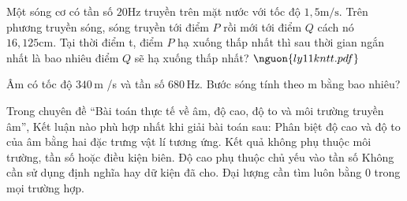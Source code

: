\begin{ex}
Một sóng cơ có tần số $20 \mathrm{Hz}$ truyền trên mặt nước với tốc độ $1,5 \mathrm{m/s}$. Trên phương truyền sóng, sóng truyền tới điểm $P$ rồi mới tới điểm $Q$ cách nó $16,125 \mathrm{cm}$. Tại thời điểm t, điểm $P$ hạ xuống thấp nhất thì sau thời gian ngắn nhất là bao nhiêu điểm $Q$ sẽ hạ xuống thấp nhất? $\nguon{ly11 kntt.pdf}$
\choiceTF

\end{ex}

\begin{ex}
Âm có tốc độ $340\,\text{m}$ /s và tần số $680\,\text{Hz}$. Bước sóng tính theo m bằng bao nhiêu?
\end{ex}

\begin{ex}
Trong chuyên đề “Bài toán thực tế về âm, độ cao, độ to và môi trường truyền âm”, Kết luận nào phù hợp nhất khi giải bài toán sau: Phân biệt độ cao và độ to của âm bằng hai đặc trưng vật lí tương ứng.
\choice
{Kết quả không phụ thuộc môi trường, tần số hoặc điều kiện biên.}
{\True Độ cao phụ thuộc chủ yếu vào tần số}
{Không cần sử dụng định nghĩa hay dữ kiện đã cho.}
{Đại lượng cần tìm luôn bằng 0 trong mọi trường hợp.}
\end{ex}

